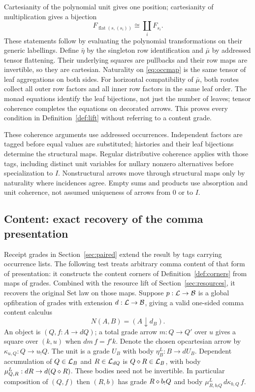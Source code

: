 \documentclass[11pt]{article}
\numberwithin{equation}{section}
\theoremstyle{definition}\newtheorem{definition}[theorem]{Definition}
\newcommand{\B}{\mathcal B}\newcommand{\J}{\mathcal J}
\begin{document}
Cartesianity of the polynomial unit gives one position; cartesianity
of multiplication gives a bijection
\[
 F_{\operatorname{flat}(s,(s_i))}\cong\coprod_iF_{s_i}.
\]
These statements follow by evaluating the polynomial transformations
on their generic labellings. Define $\bar\eta$ by the singleton row
identification and $\bar\mu$ by addressed tensor flattening. Their
underlying squares are pullbacks and their row maps are invertible,
so they are cartesian. Naturality on \eqref{eq:occmap} is the same tensor
of leaf aggregations on both sides. For horizontal compatibility of
$\bar\mu$, both routes collect all outer row factors and all inner row
factors in the same leaf order. The monad equations identify the leaf
bijections, not just the number of leaves; tensor coherence completes
the equations on decorated arrows. This proves every condition in
Definition~\ref{def:lift} without referring to a content grade.

These coherence arguments use addressed occurrences. Independent factors
are tagged before equal values are substituted; histories and their leaf
bijections determine the structural maps. Regular distributive coherence
\cite{Laplaza} applies with those tags, including distinct unit variables
for nullary nonzero alternatives before specialization to $I$.
Nonstructural arrows move through structural maps only by naturality
where incidences agree. Empty sums and products use absorption and unit
coherence, not assumed uniqueness of arrows from $0$ or to $I$.

\subsection{Content: exact recovery of the comma presentation}\label{sec:recovery}
Receipt grades in Section~\ref{sec:paired} extend the result by tags
carrying occurrence lists. The following test treats arbitrary comma
content of that form of presentation: it constructs the content corners
of Definition~\ref{def:corners} from maps of grades. Combined with the
resource lift of Section~\ref{sec:resources}, it recovers the original Set
law on those maps. Suppose $p:\Lcat\to\B$ is a global opfibration of grades with extension
$d:\Lcat\to\B$, giving a valid one-sided comma content calculus
\[
 N(A,B)=(A\downarrow d_B).
\]
An object is $(Q,f:A\to dQ)$; a total grade arrow $m:Q\to Q'$ over
$u$ gives a square over $(k,u)$ when $dm\,f=f'k$. Denote the chosen
opcartesian arrow by $\kappa_{u,Q}:Q\to u_!Q$.
The unit is a grade $U_B$ with body $\eta^L_B:B\to dU_B$.
Dependent accumulation of $Q\in\mathcal L_B$ and $R\in\mathcal L_{dQ}$ is
$Q\mathbin{\diamond} R\in\mathcal L_B$, with body
$\mu^L_{Q,R}:dR\to d(Q\mathbin{\diamond} R)$. These bodies need not be invertible.
In particular composition of $(Q,f)$ then $(R,b)$ has grade
$R\mathbin{\diamond} b_!Q$ and body
$\mu^L_{R,b_!Q}\,d\kappa_{b,Q}\,f$.
\end{document}
